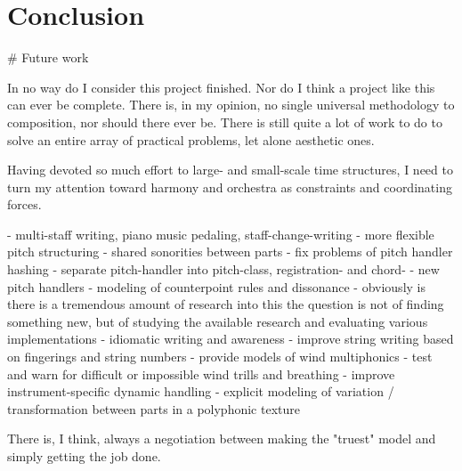 \chapter{Conclusion}
\label{chap:conclusion}

\begin{markdown}

# Future work

In no way do I consider this project finished. Nor do I think a project like
this can ever be complete. There is, in my opinion, no single universal
methodology to composition, nor should there ever be. There is still quite a
lot of work to do to solve an entire array of practical problems, let alone
aesthetic ones.



Having devoted so much effort to large- and small-scale time structures, I need
to turn my attention toward harmony and orchestra as constraints and
coordinating forces.

-   multi-staff writing, piano music pedaling, staff-change-writing
-   more flexible pitch structuring
    -   shared sonorities between parts
    -   fix problems of pitch handler hashing
    -   separate pitch-handler into pitch-class, registration- and chord-
    -   new pitch handlers
    -   modeling of counterpoint rules and dissonance
        - obviously is there is a tremendous amount of research into this
          the question is not of finding something new, but of studying the 
          available research and evaluating various implementations
-   idiomatic writing and awareness
    -   improve string writing based on fingerings and string numbers
    -   provide models of wind multiphonics
    -   test and warn for difficult or impossible wind trills and breathing
    -   improve instrument-specific dynamic handling
-   explicit modeling of variation / transformation between parts in a
    polyphonic texture

There is, I think, always a negotiation between making the "truest" model and
simply getting the job done.



\end{markdown}